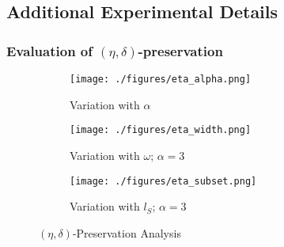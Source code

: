 \subsection{Additional Experimental Details}\label{app:extraresults}
\subsubsection{Evaluation of $(\eta,\delta)$-preservation}\label{app:numerical}

\begin{figure*}[ht]
    \begin{subfigure}[b]{0.33\linewidth}\centering
    \texttt{[image: ./figures/eta\_alpha.png]}
        \caption{Variation with $\alpha$}
        \label{fig:eta:alpha}
    \end{subfigure}
    \begin{subfigure}[b]{0.33\linewidth}\centering
    \texttt{[image: ./figures/eta\_width.png]}
        \caption{Variation with $\omega$; $\alpha = 3$}
        \label{fig:eta:width}
    \end{subfigure}
    \begin{subfigure}[b]{0.33\linewidth}\centering
    \texttt{[image: ./figures/eta\_subset.png]}
        \caption{Variation with $l_S$; $\alpha = 3$}
        \label{fig:eta:subset}
    \end{subfigure}
        \caption{$(\eta,\delta)$-Preservation Analysis}
        \label{fig: eta delta preservation}
\end{figure*}


